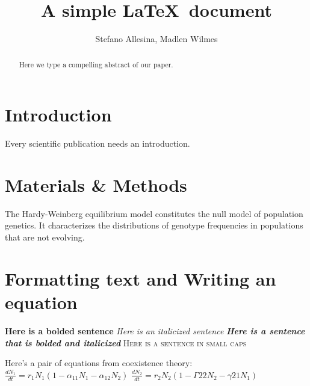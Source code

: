\documentclass[12pt]{article}
\title{A simple \LaTeX\ document}
\author{Stefano Allesina, Madlen Wilmes}
\date{}
\begin{document}
\maketitle
\begin{abstract}
Here we type a compelling abstract of our paper.
\end{abstract}
\section{Introduction}
Every scientific publication needs an introduction.
\section{Materials \& Methods}
The Hardy-Weinberg equilibrium model constitutes the null model of population genetics. It characterizes the distributions of genotype  frequencies in populations that are not evolving.

\section{Formatting text and Writing an equation}

\textbf{Here is a bolded sentence}     
\newline
\textit{Here is an italicized sentence}     
\newline
\textit{\textbf{Here is a sentence that is bolded and italicized}}    
\newline
\textsc{Here is a sentence in small caps}   
\newline

Here's a pair of equations from coexistence theory:
\newline
$\frac{dN_{1}}{dt} = r_{1}N_{1} (1 - \alpha_{11}N_{1} - \alpha_{12}N_{2})$
$\frac{dN_{2}}{dt} = r_{2}N_{2} (1 - \Gamma{22}N_{2} - \gamma{21}N_{1})$
\end{document}
